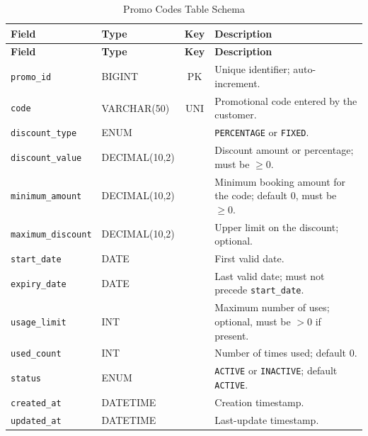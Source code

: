 \documentclass[10pt,a4paper]{report}
\newcommand{\col}[1]{\texttt{#1}}
\begin{document}
{\begin{longtable}{@{}llc>{\raggedright\arraybackslash}p{6.6cm}@{}}
\caption{Promo Codes Table Schema}\label{tab:promo}\\
\toprule \textbf{Field} & \textbf{Type} & \textbf{Key} & \textbf{Description}\\ \midrule \endfirsthead
\toprule \textbf{Field} & \textbf{Type} & \textbf{Key} & \textbf{Description}\\ \midrule \endhead
\bottomrule \endfoot
\col{promo_id} & BIGINT & PK & Unique identifier; auto-increment.\\
\col{code} & VARCHAR(50) & UNI & Promotional code entered by the customer.\\
\col{discount_type} & ENUM & & \col{PERCENTAGE} or \col{FIXED}.\\
\col{discount_value} & DECIMAL(10,2) & & Discount amount or percentage; must be $\geq 0$.\\
\col{minimum_amount} & DECIMAL(10,2) & & Minimum booking amount for the code; default 0, must be $\geq 0$.\\
\col{maximum_discount} & DECIMAL(10,2) & & Upper limit on the discount; optional.\\
\col{start_date} & DATE & & First valid date.\\
\col{expiry_date} & DATE & & Last valid date; must not precede \col{start_date}.\\
\col{usage_limit} & INT & & Maximum number of uses; optional, must be $> 0$ if present.\\
\col{used_count} & INT & & Number of times used; default 0.\\
\col{status} & ENUM & & \col{ACTIVE} or \col{INACTIVE}; default \col{ACTIVE}.\\
\col{created_at} & DATETIME & & Creation timestamp.\\
\col{updated_at} & DATETIME & & Last-update timestamp.\\
\end{longtable}

}
\end{document}
